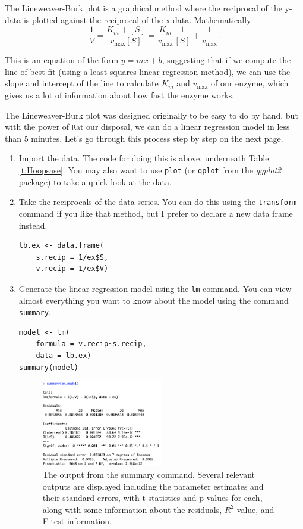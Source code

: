 \documentclass[11pt]{article}
\newcommand{\np}{\vfill\newpage}
\newcommand{\R}{\texttt{R}}
\begin{document}
The Lineweaver-Burk plot is a graphical method where the reciprocal of the y-data is plotted against the reciprocal of the x-data. Mathematically:
\[
\frac{1}{V} = \frac{K_m + [S]}{v_{\mathrm{max}}[S]} = \frac{K_m}{v_{\mathrm{max}}}\frac{1}{[S]} + \frac{1}{v_{\mathrm{max}}}.
\]

This is an equation of the form \(y=mx+b\), suggesting that if we compute the line of best fit (using a least-squares linear regression method), we can use the slope and intercept of the line to calculate \(K_m\) and \(v_{\mathrm{max}}\) of our enzyme, which gives us a lot of information about how fast the enzyme works.

The Lineweaver-Burk plot was designed originally to be easy to do by hand, but with the power of \R at our disposal, we can do a linear regression model in less than 5 minutes. Let's go through this process step by step on the next page.

\np

\begin{enumerate}

	\item Import the data. The code for doing this is above, underneath Table \ref{t:Hoopsase}. You may also want to use \texttt{plot} (or \texttt{qplot} from the {\it ggplot2} package) to take a quick look at the data.
	\item Take the reciprocals of the data series. You can do this using the \texttt{transform} command if you like that method, but I prefer to declare a new data frame instead.
		\begin{lstlisting}
lb.ex <- data.frame(
	s.recip = 1/ex$S,
	v.recip = 1/ex$V)
		\end{lstlisting}
	\item Generate the linear regression model using the \texttt{lm} command. You can view almost everything you want to know about the model using the command \texttt{summary}.
	\begin{lstlisting}
model <- lm(
	formula = v.recip~s.recip,
	data = lb.ex)
summary(model)
	\end{lstlisting}
	
	\begin{figure}[h!]
	\centering
	\includegraphics[width=0.5\textwidth]{output_ex_model.png}
	\caption{The output from the summary command. Several relevant outputs are displayed including the parameter estimates and their standard errors, with t-statistics and p-values for each, along with some information about the residuals, \(R^2\) value, and F-test information.}
	\end{figure}
		
\end{enumerate}
\end{document}
